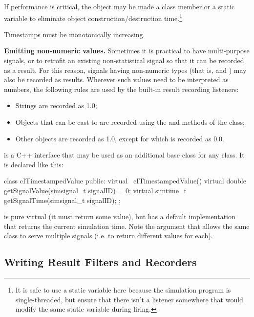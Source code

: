 \begin{ned}
If performance is critical, the  object may be
made a class member or a static variable to eliminate object
construction/destruction time.\footnote{It is safe to use a static
variable here because the simulation program is single-threaded,
but ensure that there isn't a listener somewhere that would modify
the same static variable during firing.}

Timestamps must be monotonically increasing.

\textbf{Emitting non-numeric values.} Sometimes it is practical to have
multi-purpose signals, or to retrofit an existing non-statistical signal so
that it can be recorded as a result. For this reason, signals having
non-numeric types (that is,  and ) may
also be recorded as results. Wherever such values need to be interpreted as
numbers, the following rules are used by the built-in result recording
listeners:

\begin{itemize}
  \item Strings are recorded as 1.0;
  \item Objects that can be cast to  are recorded
     using the  and 
     methods of the class;
  \item Other objects are recorded as 1.0, except for  which is recorded as 0.0.
\end{itemize}

 is a C++ interface that may be used as an additional
base class for any class. It is declared like this:

\begin{cpp}
class cITimestampedValue {
    public:
        virtual ~cITimestampedValue() {}
        virtual double getSignalValue(simsignal_t signalID) = 0;
        virtual simtime_t getSignalTime(simsignal_t signalID);
};
\end{cpp}

 is pure virtual (it must return some value),
but  has a default implementation that
returns the current simulation time. Note the  argument
that allows the same class to serve multiple signals (i.e. to return
different values for each).


\subsection{Writing Result Filters and Recorders}
\label{sec:simple-modules:writing-result-filters}


\end{ned}
